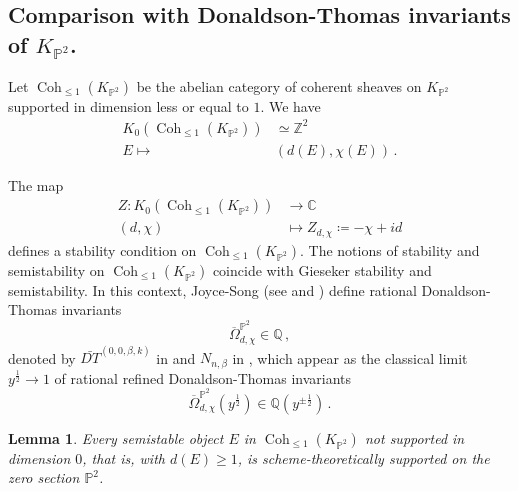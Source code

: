 \documentclass[11pt,letterpaper]{amsart}
\newtheorem{lem}[defn]{Lemma}
\newcommand\C{\mathbb C}
\newcommand\PP{\mathbb P}
\newcommand\Q{\mathbb Q}
\newcommand\Z{\mathbb Z}
\newcommand\Coh{\operatorname{Coh}}
\begin{document}
\subsection{Comparison with Donaldson-Thomas invariants of $K_{\PP^2}$.}
\label{section_dt}

Let $\Coh_{\leqslant 1}(K_{\PP^2})$ be the  abelian category of coherent sheaves on 
$K_{\PP^2}$ supported in dimension less or equal to $1$. We have 
\begin{align*}
K_0(\Coh_{\leqslant 1}(K_{\PP^2})) &\simeq \Z^2
\\ 
E \longmapsto & (d(E),\chi(E))\,.
\end{align*}

The map 
\begin{align*}
Z \colon K_0(\Coh_{\leqslant 1}(K_{\PP^2})) &\longrightarrow \C \\
(d,\chi) &\longmapsto Z_{d,\chi}
\coloneq -\chi+id 
\end{align*}
defines a stability condition on $\Coh_{\leqslant 1}(K_{\PP^2})$.
The notions of stability and semistability on $\Coh_{\leqslant 1}(K_{\PP^2})$ coincide with Gieseker stability and semistability. 
In this context, Joyce-Song (see \cite[\S 6.4]{MR2951762} and \cite[\S 4.4-4.5]{MR2892766}) define rational Donaldson-Thomas invariants 
\[\overline{\Omega}_{d,\chi}^{\PP^2} \in \Q\,,\] 
denoted by $\bar{DT}^{(0,0,\beta,k)}$
in \cite{MR2951762} and $N_{n,\beta}$ in 
\cite{MR2892766},
which appear as the classical limit $y^{\frac{1}{2}} \rightarrow 1$ of rational refined Donaldson-Thomas invariants
\[\overline{\Omega}_{d,\chi}^{\PP^2}(y^{\frac{1}{2}}) \in \Q(y^{\pm \frac{1}{2}})\,.\] 


\begin{lem} \label{lem_zero_section}
Every semistable object $E$ in $\Coh_{\leqslant 1}(K_{\PP^2})$ not supported in dimension $0$, that is, with $d(E) \geq 1$, is scheme-theoretically supported on the zero section $\PP^2$.
\end{lem}
\end{document}
